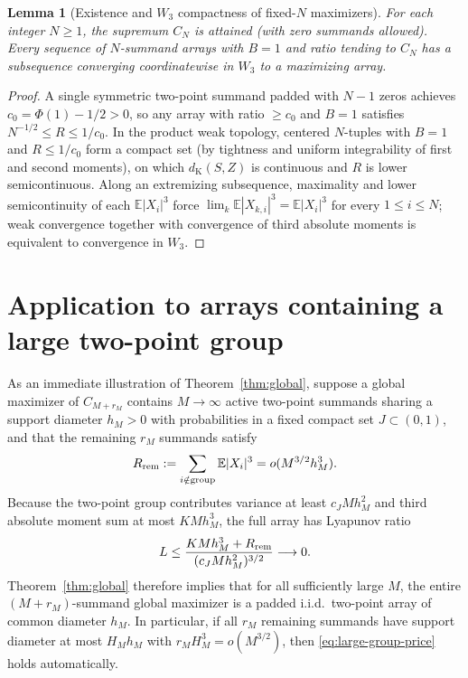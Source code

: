 \documentclass[11pt]{article}
\numberwithin{equation}{section}
\newtheorem{lemma}[theorem]{Lemma}
\theoremstyle{remark}\newtheorem{remark}[theorem]{Remark}
\newcommand{\E}{\mathbb E}\newcommand{\Pp}{\mathbb P}
\begin{document}
\begin{lemma}[Existence and $W_3$ compactness of fixed-$N$ maximizers]\label{lem:attainment}
For each integer $N\ge1$, the supremum $C_N$ is attained (with zero summands
allowed). Every sequence of $N$-summand arrays with $B=1$ and ratio tending
to $C_N$ has a subsequence converging coordinatewise in $W_3$ to a maximizing
array.
\end{lemma}
\begin{proof}
A single symmetric two-point summand padded with $N-1$ zeros achieves
$c_0=\Phi(1)-1/2>0$, so any array with ratio $\ge c_0$ and $B=1$ satisfies
$N^{-1/2}\le R\le1/c_0$. In the product weak topology, centered $N$-tuples
with $B=1$ and $R\le1/c_0$ form a compact set (by tightness and uniform
integrability of first and second moments), on which $d_{\mathrm K}(S,Z)$ is
continuous and $R$ is lower semicontinuous. Along an extremizing subsequence,
maximality and lower semicontinuity of each $\E|X_i|^3$ force
$\lim_k\E|X_{k,i}|^3=\E|X_i|^3$ for every $1\le i\le N$; weak convergence
together with convergence of third absolute moments is equivalent to
convergence in $W_3$.
\end{proof}





\section{Application to arrays containing a large two-point group}\label{sec:large-group-example}

As an immediate illustration of Theorem~\ref{thm:global}, suppose a global
maximizer of $C_{M+r_M}$ contains $M\to\infty$ active two-point summands
sharing a support diameter $h_M>0$ with probabilities in a fixed compact set
$J\subset(0,1)$, and that the remaining $r_M$ summands satisfy
\begin{equation}\label{eq:large-group-price}
                      R_{\rm rem}:=\sum_{i\notin\text{group}}\E|X_i|^3=o(M^{3/2}h_M^3).
\end{equation}
Because the two-point group contributes variance at least $c_JMh_M^2$ and
third absolute moment sum at most $KMh_M^3$, the full array has Lyapunov ratio
\[
 L\le\frac{KMh_M^3+R_{\rm rem}}
                 {(c_JMh_M^2)^{3/2}}\longrightarrow0.
\]
Theorem~\ref{thm:global} therefore implies that for all sufficiently large
$M$, the entire $(M+r_M)$-summand global maximizer is a padded i.i.d.\
two-point array of common diameter $h_M$. In particular, if all $r_M$
remaining summands have support diameter at most $H_Mh_M$ with
$r_MH_M^3=o(M^{3/2})$, then \eqref{eq:large-group-price} holds automatically.

\begingroup\small\raggedright

\endgroup
\end{document}

